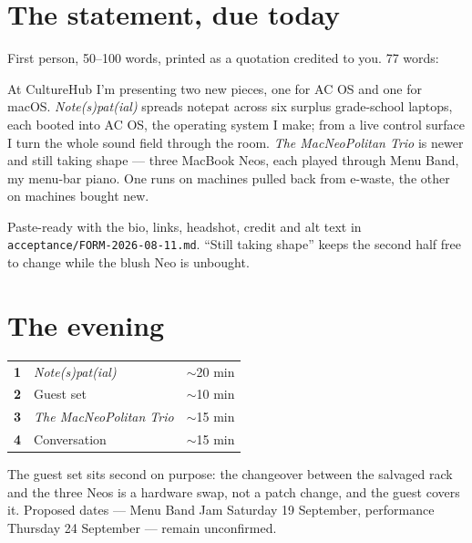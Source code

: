 \documentclass[11pt]{article}
\newcommand{\dto}{{\normalfont--}}
\newcommand{\quoteblock}[2]{%
  \begingroup\setlength{\fboxsep}{11pt}%
  \noindent\colorbox{acpale}{%
    \begin{minipage}{\dimexpr\linewidth-2\fboxsep\relax}
    \fontsize{11.2pt}{14.6pt}\selectfont\color{acdark}#1
    \par\vspace{0.7em}
    {\fontsize{9pt}{11.4pt}\selectfont\color{acgray}#2}
    \end{minipage}}%
  \endgroup\par\vspace{0.7em}}
\begin{document}
\vspace{1.4em}
\noindent
\begin{minipage}[t]{0.545\linewidth}
\vspace{0pt}
\section{The statement, due today}
{\fontsize{10.2pt}{13.2pt}\selectfont First person, 50\dto100 words, printed as a
quotation credited to you. 77 words:\par}
\vspace{0.6em}
\quoteblock{At CultureHub I'm presenting two new pieces, one for AC OS and one
for macOS. \emph{Note(s)pat(ial)} spreads notepat across six surplus grade-school
laptops, each booted into AC OS, the operating system I make; from a live control
surface I turn the whole sound field through the room. \emph{The MacNeoPolitan
Trio} is newer and still taking shape — three MacBook Neos, each played through
Menu Band, my menu-bar piano. One runs on machines pulled back from e-waste, the
other on machines bought new.}%
{Paste-ready with the bio, links, headshot, credit and alt text in
\texttt{acceptance/FORM-2026-08-11.md}. ``Still taking shape'' keeps the second
half free to change while the blush Neo is unbought.}
\end{minipage}%
\hfill
\begin{minipage}[t]{0.415\linewidth}
\vspace{0pt}
\section{The evening}
{\fontsize{10.4pt}{13.4pt}\selectfont
\begin{tabularx}{\linewidth}{@{}L{0.16in} Y L{0.52in}@{}}
\textbf{1} & \emph{Note(s)pat(ial)} & ${\sim}$20 min \\[0.3em]
\textbf{2} & Guest set & ${\sim}$10 min \\[0.3em]
\textbf{3} & \emph{The MacNeoPolitan Trio} & ${\sim}$15 min \\[0.3em]
\textbf{4} & Conversation & ${\sim}$15 min \\
\end{tabularx}}

\vspace{0.6em}
{\fontsize{9.8pt}{12.4pt}\selectfont\color{acgray}
The guest set sits second on purpose: the changeover between the salvaged rack
and the three Neos is a hardware swap, not a patch change, and the guest covers
it. Proposed dates — Menu Band Jam Saturday 19 September, performance Thursday
24 September — remain unconfirmed.\par}
\end{minipage}
\end{document}
